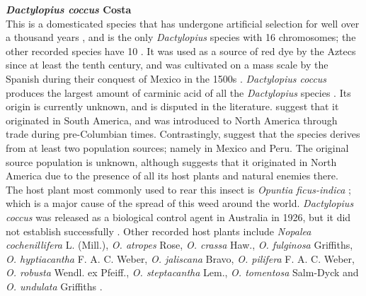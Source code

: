 \noindent \textbf{\textit{Dactylopius coccus} Costa} \\
This is a domesticated species that has undergone artificial selection for well over a thousand years \citep{gon1984invertebrate, Chavez-Moreno2009TheDistribution}, and is the only \textit{Dactylopius} species with 16 chromosomes; the other recorded species have 10 \citep{gavrilov2007catalog}. It was used as a source of red dye by the Aztecs since at least the tenth century, and was cultivated on a mass scale by the Spanish during their conquest of Mexico in the 1500s \citep{Mann1969Cactus-feedingMites, Perez-Guerra1992, Greenfield2005, Chavez-Moreno2009TheDistribution}. \textit{Dactylopius coccus} produces the largest amount of carminic acid of all the \textit{Dactylopius} species \citep{Chavez-Moreno2009TheDistribution}. Its origin is currently unknown, and is disputed in the literature. \citet{Rodriguez2001} suggest that it originated in South America, and was introduced to North America through trade during pre-Columbian times. Contrastingly, \citet{Campana2015} suggest that the species derives from at least two population sources; namely in Mexico and Peru. The original source population is unknown, although  \citet{portillo2007biogeography} suggests that it originated in North America due to the presence of all its host plants and natural enemies there. \\ 
The host plant most commonly used to rear this insect is \textit{Opuntia ficus-indica} \citep{Donkin1977SpanishCactus, Portillo2006AENEMIES}; which is a major cause of the spread of this weed around the world.
\textit{Dactylopius coccus} was released as a biological control agent in Australia in 1926, but it did not establish successfully \citep{Dodd1940, Winston2014BiologicalWeeds.}. Other recorded host plants include \textit{Nopalea cochenillifera} L. (Mill.), \textit{O. atropes} Rose, \textit{O. crassa} Haw., \textit{O. fulginosa} Griffiths, \textit{O. hyptiacantha} F. A. C. Weber, \textit{O. jaliscana} Bravo, \textit{O. pilifera} F. A. C. Weber, \textit{O. robusta} Wendl. ex Pfeiff., \textit{O. steptacantha} Lem., \textit{O. tomentosa} Salm-Dyck and \textit{O. undulata} Griffiths \citep{Mann1969Cactus-feedingMites, Chavez-Moreno2011DistributionOpuntioideae}. \newline

